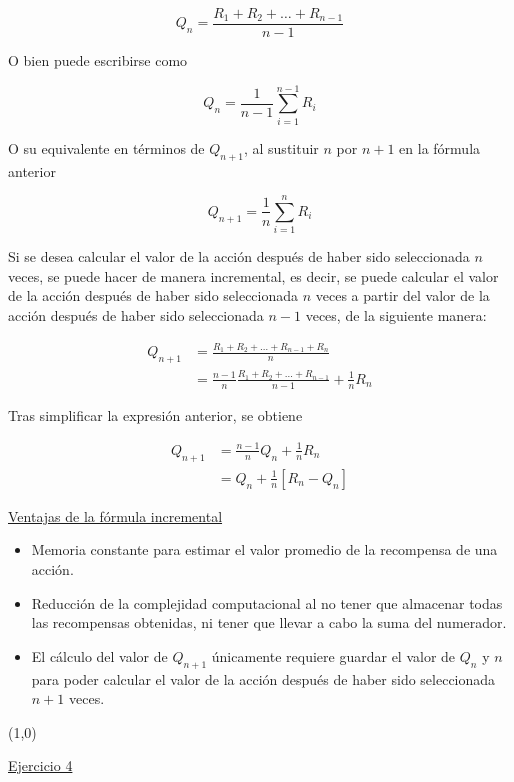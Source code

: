 \documentclass[12pt]{article}
\newlength\tindent
\renewcommand{\indent}{\hspace*{\tindent}}
\begin{document}
    \[ Q_{n} = \frac{R_{1} + R_{2} + \ldots + R_{n-1}}{n-1} \]

    O bien puede escribirse como

    \[ Q_{n} = \frac{1}{n-1} \sum_{i=1}^{n-1} R_{i} \]

    O su equivalente en términos de $Q_{n+1}$, al sustituir $n$ por $n+1$ en la fórmula anterior

    \[ Q_{n+1} = \frac{1}{n} \sum_{i=1}^{n} R_{i} \]

    Si se desea calcular el valor de la acción después de haber sido seleccionada $n$ veces, se puede hacer de manera incremental, es decir, se puede calcular el valor de la acción después de haber sido seleccionada $n$ veces a partir del valor de la acción después de haber sido seleccionada $n-1$ veces, de la siguiente manera:

    \begin{align*}
        Q_{n+1} &= \frac{R_{1} + R_{2} + \ldots + R_{n-1} + R_{n}}{n} \\
        &= \frac{n-1}{n} \frac{R_{1} + R_{2} + \ldots + R_{n-1}}{n-1} + \frac{1}{n} R_{n}
    \end{align*}

    Tras simplificar la expresión anterior, se obtiene

    \begin{align*}
        Q_{n+1} &= \frac{n-1}{n} Q_{n} + \frac{1}{n} R_{n} \\
        &= Q_{n} + \frac{1}{n} \left[ R_{n} - Q_{n} \right]
    \end{align*}

    \indent\underline{Ventajas de la fórmula incremental}

    \begin{itemize}
        \item Memoria constante para estimar el valor promedio de la recompensa de una acción.
        \item Reducción de la complejidad computacional al no tener que almacenar todas las recompensas obtenidas, ni tener que llevar a cabo la suma del numerador.
        \item El cálculo del valor de $Q_{n+1}$ únicamente requiere guardar el valor de $Q_{n}$ y $n$ para poder calcular el valor de la acción después de haber sido seleccionada $n+1$ veces.
    \end{itemize}

    \line(1,0){\textwidth}

    \indent\underline{Ejercicio 4}
\end{document}
